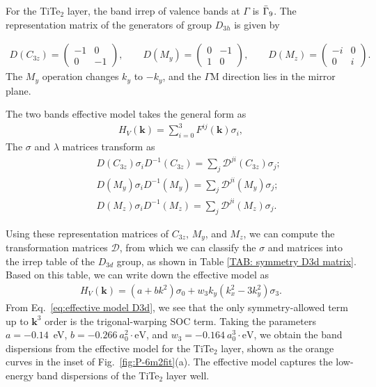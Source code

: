 \documentclass[aps, preprint, prb,]{revtex4-2}
\def\kk{\mathbf{k}}
\begin{document}
For the TiTe$_2$ layer, the band irrep of valence bands at $\Gamma$ is $\Bar{\Gamma}_9$. The representation matrix of the generators of group $D_{3h}$ is given by

\begin{eqnarray}
D(C_{3z})=
\begin{pmatrix}
-1 & 0\\
0 & -1
\end{pmatrix},\qquad
D(M_y)=
\begin{pmatrix}
0 & -1\\
1 & 0
\end{pmatrix},\qquad
D(M_z)=
\begin{pmatrix}
-i & 0\\
0 & i
\end{pmatrix}.
\end{eqnarray}
The $M_y$ operation changes $k_y$ to $-k_y$, and the $\Gamma\mathrm{M}$ direction lies in the mirror plane.

The two bands effective model takes the general form as
\begin{eqnarray}
    H_{V}(\kk)=\sum^{3}_{i=0}F^{ij}(\kk)\sigma_i,
\end{eqnarray}
 The $\sigma$ and $\lambda$ matrices transform as
\begin{eqnarray}
  &&D(C_{3z}) \sigma_i D^{-1}(C_{3z})=\sum_j\mathcal{D}^{ji}(C_{3z}) \sigma_j; 
  \\
  && D(M_{y}) \sigma_i D^{-1}(M_{y})=\sum_j\mathcal{D}^{ji}(M_{y}) \sigma_j;
  \\
   &&D(M_{z}) \sigma_i D^{-1}(M_{z})=\sum_j\mathcal{D}^{ji}(M_{z}) \sigma_j.
\end{eqnarray}


Using these representation matrices of $C_{3z}$, $M_y$, and $M_z$, we can compute the transformation matrices $\mathcal{D}$, from which we can classify the $\sigma$ and matrices into the irrep table of the $D_{3d}$ group, as shown in Table \ref{TAB: symmetry D3d matrix}.  Based on this table, we can write down the effective model as 
\begin{eqnarray} \label{eq:effective model D3d}
     H_{V}(\kk)=(a+bk^2)\sigma_0+w_3 k_y(k_x^2-3k_y^2) \sigma_3.
\end{eqnarray}
From Eq.~\ref{eq:effective model D3d}, we see that the only symmetry-allowed term up to $\kk^3$ order is the trigonal-warping SOC term. Taking the parameters $a=-0.14$~eV, $b=-0.266~a_0^2 \cdot \mathrm{eV}$, and $w_3=-0.164~a_0^3 \cdot \mathrm{eV}$, we obtain the band dispersions from the effective model for the TiTe$_2$ layer, shown as the orange curves in the inset of Fig.~\ref{fig:P-6m2fit}(a). The effective model captures the low-energy band dispersions of the TiTe$_2$ layer well.
\end{document}
